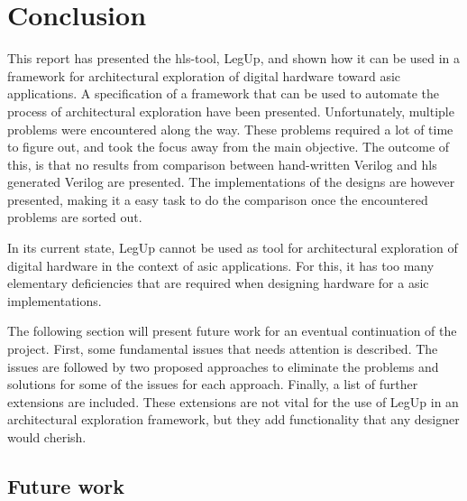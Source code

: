 \chapter{Conclusion}
\label{chp:conclusion} 
This report has presented the \gls{hls}-tool, LegUp, and shown how it can be used in a framework for architectural exploration of digital hardware toward \gls{asic} applications. A specification of a framework that can be used to automate the process of architectural exploration have been presented. Unfortunately, multiple problems were encountered along the way. These problems required a lot of time to figure out, and took the focus away from the main objective. The outcome of this, is that no results from comparison between hand-written Verilog and \gls{hls} generated Verilog are presented. The implementations of the designs are however presented, making it a easy task to do the comparison once the encountered problems are sorted out.

In its current state, LegUp cannot be used as tool for architectural exploration of digital hardware in the context of \gls{asic} applications. For this, it has too many elementary deficiencies that are required when designing hardware for a \gls{asic} implementations. 

The following section will present future work for an eventual continuation of the project. First, some fundamental issues that needs attention is described. The issues are followed by two proposed approaches to eliminate the problems and solutions for some of the issues for each approach. Finally, a list of further extensions are included. These extensions are not vital for the use of LegUp in an architectural exploration framework, but they add functionality that any designer would cherish.
\section{Future work}
\label{sec:futurework} 


